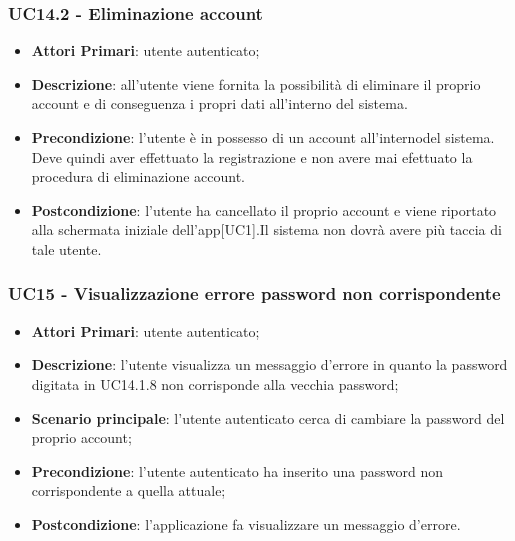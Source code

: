 \subsubsection{UC14.2 - Eliminazione account}
\begin{itemize}
	\item \textbf{Attori Primari}: utente autenticato;
	\item \textbf{Descrizione}: all'utente viene fornita la possibilità di eliminare il proprio account e di conseguenza i propri dati all'interno del sistema.
	\item \textbf{Precondizione}: l'utente è in possesso di un account all'internodel sistema. Deve quindi aver effettuato la registrazione e non avere mai efettuato la procedura di eliminazione account.
	\item \textbf{Postcondizione}: l'utente ha cancellato il proprio account e viene riportato alla schermata iniziale dell'app[UC1].Il sistema non dovrà avere più taccia di tale utente.
\end{itemize}


\subsubsection{UC15 - Visualizzazione errore password non corrispondente}
\begin{itemize}
	\item \textbf{Attori Primari}: utente autenticato;
	\item \textbf{Descrizione}: l'utente visualizza un messaggio d'errore in quanto la password digitata in UC14.1.8 non corrisponde alla vecchia password;
	\item \textbf{Scenario principale}: l'utente autenticato cerca di cambiare la password del proprio account;
	\item \textbf{Precondizione}: l'utente autenticato ha inserito una password non corrispondente a quella attuale;
	\item \textbf{Postcondizione}: l'applicazione fa visualizzare un messaggio d'errore.
\end{itemize}



